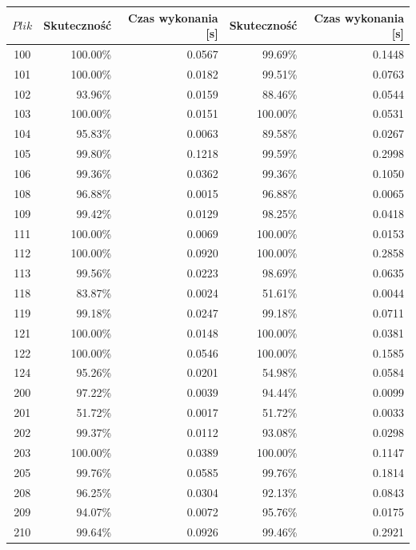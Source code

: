 \begin{table}[H]
	\centering
	\begin{tabular}{|c|r|r|r|r|}
		\hline

		$Plik$ & Skuteczność & Czas wykonania [s] & Skuteczność & Czas wykonania [s] \\
		\hline
100 & 100.00\% & 0.0567 & 99.69\% & 0.1448 \\ 
\hline
101 & 100.00\% & 0.0182 & 99.51\% & 0.0763 \\ 
\hline
102 & 93.96\% & 0.0159 & 88.46\% & 0.0544 \\ 
\hline
103 & 100.00\% & 0.0151 & 100.00\% & 0.0531 \\ 
\hline
104 & 95.83\% & 0.0063 & 89.58\% & 0.0267 \\ 
\hline
105 & 99.80\% & 0.1218 & 99.59\% & 0.2998 \\ 
\hline
106 & 99.36\% & 0.0362 & 99.36\% & 0.1050 \\ 
\hline
108 & 96.88\% & 0.0015 & 96.88\% & 0.0065 \\ 
\hline
109 & 99.42\% & 0.0129 & 98.25\% & 0.0418 \\ 
\hline
111 & 100.00\% & 0.0069 & 100.00\% & 0.0153 \\ 
\hline
112 & 100.00\% & 0.0920 & 100.00\% & 0.2858 \\ 
\hline
113 & 99.56\% & 0.0223 & 98.69\% & 0.0635 \\ 
\hline
118 & 83.87\% & 0.0024 & 51.61\% & 0.0044 \\ 
\hline
119 & 99.18\% & 0.0247 & 99.18\% & 0.0711 \\ 
\hline
121 & 100.00\% & 0.0148 & 100.00\% & 0.0381 \\ 
\hline
122 & 100.00\% & 0.0546 & 100.00\% & 0.1585 \\ 
\hline
124 & 95.26\% & 0.0201 & 54.98\% & 0.0584 \\ 
\hline
200 & 97.22\% & 0.0039 & 94.44\% & 0.0099 \\ 
\hline
201 & 51.72\% & 0.0017 & 51.72\% & 0.0033 \\ 
\hline
202 & 99.37\% & 0.0112 & 93.08\% & 0.0298 \\ 
\hline
203 & 100.00\% & 0.0389 & 100.00\% & 0.1147 \\ 
\hline
205 & 99.76\% & 0.0585 & 99.76\% & 0.1814 \\ 
\hline
208 & 96.25\% & 0.0304 & 92.13\% & 0.0843 \\ 
\hline
209 & 94.07\% & 0.0072 & 95.76\% & 0.0175 \\ 
\hline
210 & 99.64\% & 0.0926 & 99.46\% & 0.2921 \\ 

\end{tabular}
\end{table}
